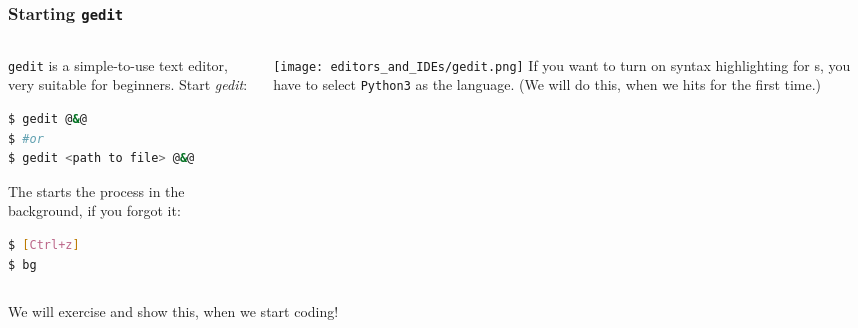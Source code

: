 \begin{frame}[fragile]
  \frametitle{Starting \texttt{gedit}}
  \begin{columns}[T]
  	 \begin{column}{.5\textwidth}
  	   \texttt{gedit} is a simple-to-use text editor, very suitable for beginners.\newline
        Start \textit{gedit}:
       \begin{lstlisting}[language=Bash, style=Shell]
$ gedit @&@
$ #or
$ gedit <path to file> @&@
      \end{lstlisting}
      The  starts the process in the background, if you forgot it:
      \begin{lstlisting}[language=Bash, style=Shell]
$ [Ctrl+z]
$ bg
      \end{lstlisting}	
    \end{column}
    \begin{column}{.5\textwidth}
      \texttt{[image: editors\_and\_IDEs/gedit.png]}	\newline
        If you want to turn on syntax highlighting for s, you have to select \texttt{Python3} as the language. (We will do this, when we hits for the first time.)
    \end{column} 
  \end{columns}
  \begin{hint}[Note]
    We will exercise and show this, when we start coding!
  \end{hint}
\end{frame}
